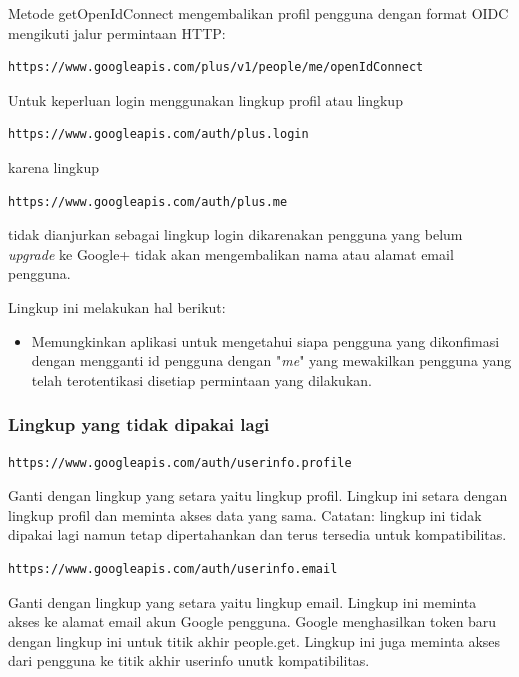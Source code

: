 Metode getOpenIdConnect mengembalikan profil pengguna dengan format OIDC
mengikuti jalur permintaan HTTP:
\begin{lstlisting}
https://www.googleapis.com/plus/v1/people/me/openIdConnect
\end{lstlisting}

Untuk keperluan login menggunakan lingkup profil atau lingkup
\begin{lstlisting}
https://www.googleapis.com/auth/plus.login
\end{lstlisting}
karena lingkup
\begin{lstlisting}
https://www.googleapis.com/auth/plus.me
\end{lstlisting}
tidak dianjurkan sebagai lingkup login dikarenakan pengguna yang belum
{\it upgrade} ke Google+ tidak akan mengembalikan nama atau alamat email
pengguna.

Lingkup ini melakukan hal berikut:
\begin{itemize}
\item
Memungkinkan aplikasi untuk mengetahui siapa pengguna yang dikonfimasi dengan
mengganti id pengguna dengan "{\it me}" yang mewakilkan pengguna yang telah
terotentikasi disetiap permintaan yang dilakukan.
\end{itemize}

\subsubsection{Lingkup yang tidak dipakai lagi}

\begin{lstlisting}
https://www.googleapis.com/auth/userinfo.profile
\end{lstlisting}

Ganti dengan lingkup yang setara yaitu lingkup profil. Lingkup ini setara
dengan lingkup profil dan meminta akses data yang sama. Catatan: lingkup ini
tidak dipakai lagi namun tetap dipertahankan dan terus tersedia untuk
kompatibilitas.

\begin{lstlisting}
https://www.googleapis.com/auth/userinfo.email
\end{lstlisting}

Ganti dengan lingkup yang setara yaitu lingkup email. Lingkup ini meminta akses
ke alamat email akun Google pengguna. Google menghasilkan token baru dengan
lingkup ini untuk titik akhir people.get. Lingkup ini juga meminta akses dari
pengguna ke titik akhir userinfo unutk kompatibilitas.

